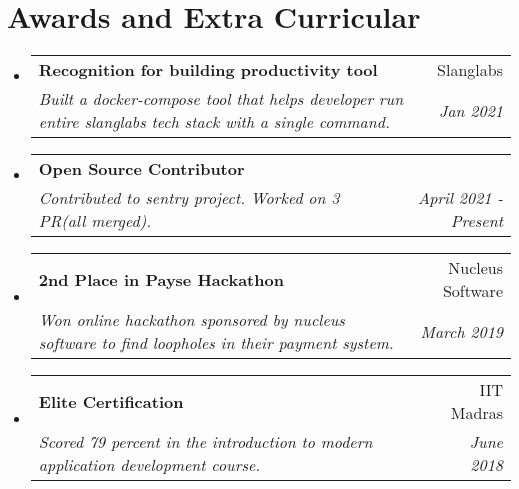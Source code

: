 \documentclass[letterpaper,11pt]{article}
\makeatletter
\newcommand{\resumeSubheading}[4]{
  \vspace{-1pt}\item
    \begin{tabular*}{0.97\textwidth}{l@{\extracolsep{\fill}}r}
      \textbf{#1} & #2 \\
      \textit{\small#3} & \textit{\small #4} \\
    \end{tabular*}\vspace{-5pt}
}
\newcommand{\resumeSubHeadingListStart}{\begin{itemize}[leftmargin=*]}
\newcommand{\resumeSubHeadingListEnd}{\end{itemize}}
\makeatother
\begin{document}
\section{Awards and Extra Curricular}
  \resumeSubHeadingListStart
    \resumeSubheading
        {Recognition for building productivity tool}{Slanglabs}
        {Built a docker-compose tool that helps developer run entire slanglabs tech stack with a single command.}{Jan 2021}
    \resumeSubheading
        {Open Source Contributor}{}
        {Contributed to sentry project. Worked on 3 PR(all merged).}{April 2021 - Present}
    \resumeSubheading
        {2nd Place in Payse Hackathon}{Nucleus Software}
        {Won online hackathon sponsored by nucleus software to find loopholes in their payment system.}{March 2019}
    \resumeSubheading
        {Elite Certification}{IIT Madras}
        {Scored 79 percent in the introduction to modern application development course.}{June 2018}
  \resumeSubHeadingListEnd
\end{document}
